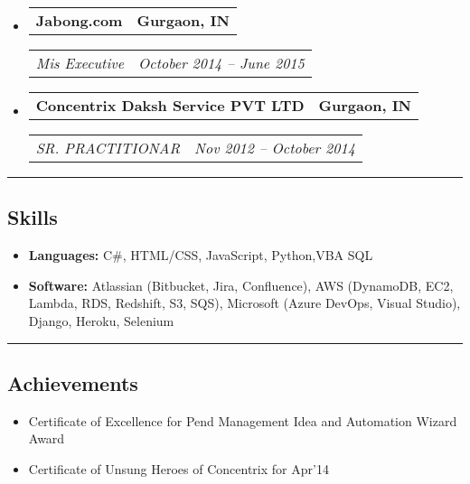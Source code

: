 \documentclass[11pt,letterpaper]{article}
\makeatletter
\newcommand{\headerrow}[2]
{\begin{tabular*}{\linewidth}{l@{\extracolsep{\fill}}r}
#1 &
#2 \\
\end{tabular*}}
\makeatother
\begin{document}
\begin{itemize}[leftmargin=1em]
	\item
	      \headerrow
	      {\textbf{Jabong.com}}
	      {\textbf{Gurgaon, IN}}
	      \headerrow
	      {\emph{Mis Executive}}
	      {\emph{October 2014 -- June 2015}}
	\item
	      \headerrow
	      {\textbf{Concentrix Daksh Service PVT LTD}}
	      {\textbf{Gurgaon, IN}}
	      \headerrow
	      {\emph{SR. PRACTITIONAR}}
	      {\emph{Nov 2012 -- October 2014}}
	      	      
\end{itemize}

\hrule
\vspace{-1em}
\subsection*{\Large Skills}

\begin{itemize}[leftmargin=1em,noitemsep]
	\item \textbf{Languages:}
	      C\#, HTML/CSS, JavaScript, Python,VBA SQL
	\item \textbf{Software:}
	      Atlassian (Bitbucket, Jira, Confluence), AWS (DynamoDB, EC2, Lambda, RDS, Redshift, S3, SQS), Microsoft (Azure DevOps, Visual Studio),  Django, Heroku, Selenium
\end{itemize}

\hrule
\vspace{-1em}
\subsection*{\Large Achievements}

\begin{itemize}[leftmargin=1em,noitemsep]
	\item Certificate of Excellence for Pend Management Idea and Automation Wizard Award
	\item Certificate of Unsung Heroes of Concentrix for Apr’14
\end{itemize}
\end{document}
